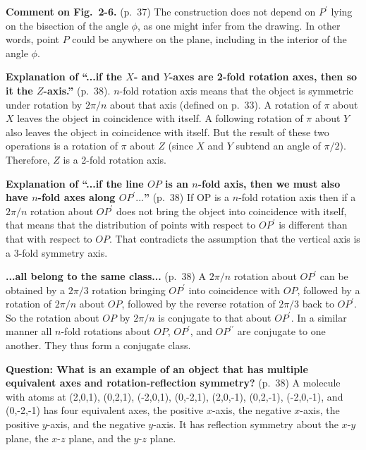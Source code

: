 {\bf Comment on Fig.\ 2-6.} (p.\ 37) The construction does not depend
on $P^\prime$ lying on the bisection of the angle $\phi$, as one might
infer from the drawing. In other words, point $P$ could be anywhere on
the plane, including in the interior of the angle $\phi$.

{\bf Explanation of ``...if the $X$- and $Y$-axes are 2-fold rotation
  axes, then so it the $Z$-axis.''} (p.\ 38). $n$-fold rotation axis
means that the object is symmetric under rotation by $2\pi/n$ about
that axis (defined on p.\ 33).  A rotation of $\pi$ about $X$ leaves
the object in coincidence with itself. A following rotation of $\pi$
about $Y$ also leaves the object in coincidence with itself. But the
result of these two operations is a rotation of $\pi$ about $Z$ (since
$X$ and $Y$ subtend an angle of $\pi/2$). Therefore, $Z$ is a 2-fold
rotation axis.

{\bf Explanation of ``...if the line $OP$ is an $n$-fold axis, then we
  must also have $n$-fold axes along $OP^\prime...$''} (p.\ 38) If OP
is a $n$-fold rotation axis then if a $2\pi/n$ rotation about $OP^\prime$
does not bring the object into coincidence with itself, that means
that the distribution of points with respect to $OP^\prime$ is
different than that with respect to $OP$. That contradicts the
assumption that the vertical axis is a 3-fold symmetry axis.

{\bf ...all belong to the same class...} (p.\ 38) A $2\pi/n$ rotation about
$OP^\prime$ can be obtained by a $2\pi/3$ rotation bringing $OP^\prime$ into
coincidence with $OP$, followed by a rotation of $2\pi/n$ about $OP$,
followed by the reverse rotation of $2\pi/3$ back to $OP^\prime$. So the
rotation about $OP$ by $2\pi/n$ is conjugate to that about $OP^\prime$. In a
similar manner all $n$-fold rotations about $OP$, $OP^\prime$, and
$OP^{\prime\prime}$ are conjugate to one another. They thus form a
conjugate class.

{\bf Question: What is an example of an object that has multiple equivalent axes and rotation-reflection symmetry?} (p.\ 38)
A molecule with atoms at (2,0,1), (0,2,1), (-2,0,1), (0,-2,1), (2,0,-1), (0,2,-1), (-2,0,-1), and (0,-2,-1) has four equivalent axes, the positive $x$-axis, the negative $x$-axis, the positive $y$-axis, and the negative $y$-axis. It has reflection symmetry about the $x$-$y$ plane, the $x$-$z$ plane, and the $y$-$z$ plane.
